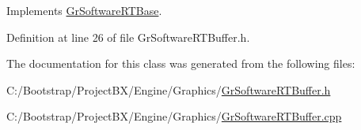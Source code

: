 Implements \hyperlink{class_gr_software_r_t_base_f1b868a5ca1e7444a44c280e76bd802d}{GrSoftwareRTBase}.

Definition at line 26 of file GrSoftwareRTBuffer.h.

The documentation for this class was generated from the following files:\begin{CompactItemize}
\item 
C:/Bootstrap/ProjectBX/Engine/Graphics/\hyperlink{_gr_software_r_t_buffer_8h}{GrSoftwareRTBuffer.h}\item 
C:/Bootstrap/ProjectBX/Engine/Graphics/\hyperlink{_gr_software_r_t_buffer_8cpp}{GrSoftwareRTBuffer.cpp}\end{CompactItemize}
